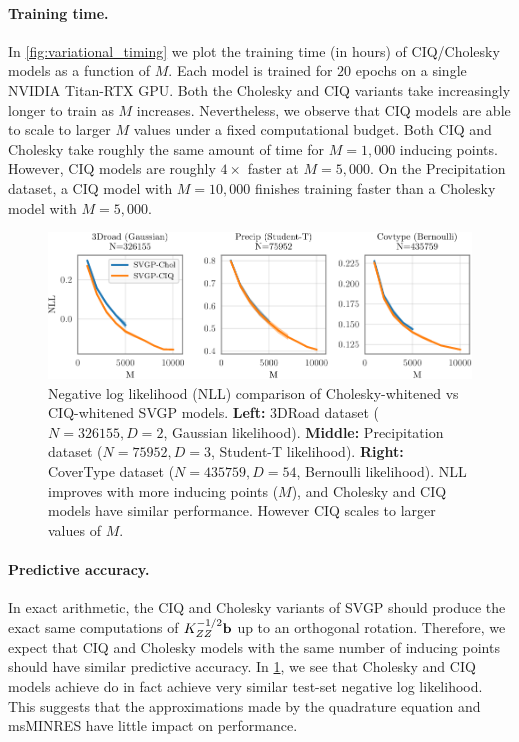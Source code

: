 \paragraph{Training time.}
In \cref{fig:variational_timing} we plot the training time (in hours) of CIQ/Cholesky models as a function of $M$.
Each model is trained for $20$ epochs on a single NVIDIA Titan-RTX GPU.
Both the Cholesky and CIQ variants take increasingly longer to train as $M$ increases.
Nevertheless, we observe that CIQ models are able to scale to larger $M$ values under a fixed computational budget.
Both CIQ and Cholesky take roughly the same amount of time for $M=1,\!000$ inducing points.
However, CIQ models are roughly $4\times$ faster at $M=5,\!000$.
On the Precipitation dataset, a CIQ model with $M=10,\!000$ finishes training faster than a Cholesky model with $M=5,\!000$.

\begin{figure}[t!]
  \centering
  \includegraphics[width=\linewidth]{figures/variational_nll.pdf}
  \caption[Negative log likelihood (NLL) comparison of Cholesky-whitened vs CIQ-whitened SVGP models.]{
    Negative log likelihood (NLL) comparison of Cholesky-whitened vs CIQ-whitened SVGP models.
    {\bf Left:} 3DRoad dataset ($N=326155, D=2$, Gaussian likelihood).
    {\bf Middle:} Precipitation dataset ($N=75952, D=3$, Student-T likelihood).
    {\bf Right:} CoverType dataset ($N=435759, D=54$, Bernoulli likelihood).
    NLL improves with more inducing points ($M$), and Cholesky and CIQ models have similar performance.
    However CIQ scales to larger values of $M$.
  }
  \label{fig:variational_nll}
\end{figure}

\paragraph{Predictive accuracy.}
In exact arithmetic, the CIQ and Cholesky variants of SVGP should produce the exact same computations of $K_{ZZ}^{-1/2} \mathbf{b}$ up to an orthogonal rotation.
Therefore, we expect that CIQ and Cholesky models with the same number of inducing points should have similar predictive accuracy.
In \cref{fig:variational_nll}, we see that Cholesky and CIQ models achieve do in fact achieve very similar test-set negative log likelihood.
This suggests that the approximations made by the quadrature equation and msMINRES have little impact on performance.

